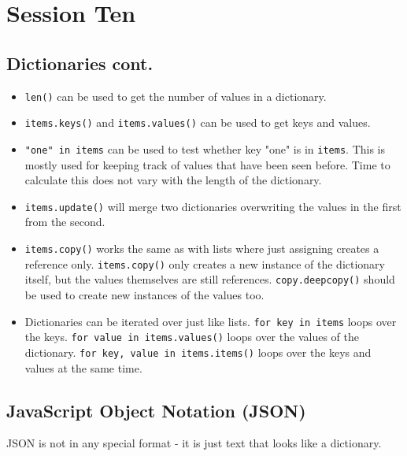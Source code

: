 \section{Session Ten}\label{sec:session_ten}

\subsection{Dictionaries cont.}\label{sub:dictionaries_cont_}

\begin{itemize}
	\item \texttt{len()} can be used to get the number of values in a dictionary.
	\item \texttt{items.keys()} and \texttt{items.values()} can be used to get keys and values.
	\item \texttt{"one" in items} can be used to test whether key "one" is in \texttt{items}.
	      This is mostly used for keeping track of values that have been seen before.
	      Time to calculate this does not vary with the length of the dictionary.
	\item \texttt{items.update()} will merge two dictionaries overwriting the values in the first from the second.
	\item \texttt{items.copy()} works the same as with lists where just assigning creates a reference only.
	      \texttt{items.copy()} only creates a new instance of the dictionary itself, but the values themselves are still references.
	      \texttt{copy.deepcopy()} should be used to create new instances of the values too.
	\item Dictionaries can be iterated over just like lists.
	      \texttt{for key in items} loops over the keys.
	      \texttt{for value in items.values()} loops over the values of the dictionary.
	      \texttt{for key, value in items.items()} loops over the keys and values at the same time.
\end{itemize}

\subsection{JavaScript Object Notation (JSON)}\label{sub:javascript_object_notation_json_}

JSON is not in any special format - it is just text that looks like a dictionary.

